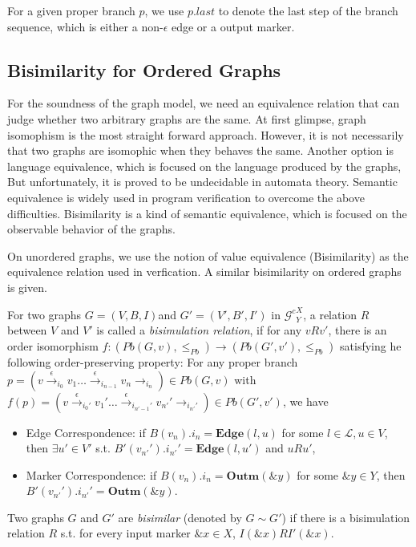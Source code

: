 \documentclass{llncs}
\newcommand{\act}[1]{{\xrightarrow{#1}{}}}
\newcommand{\Gc}{{\mathcal{G}^{c}}}
\begin{document}
For a given proper branch $p$, we use $p.last$ to denote the last step of the branch sequence, which is either a non-$\epsilon$ edge or a output marker.

\subsection{Bisimilarity for Ordered Graphs}

For the soundness of the graph model, we need an equivalence relation that can judge whether two arbitrary graphs are the same. At first glimpse, graph isomophism is the most straight forward approach. However, it is not necessarily that two graphs are isomophic when they behaves the same. Another option is language equivalence, which is focused on the language produced by the graphs, But unfortunately, it is proved to be undecidable in automata theory. Semantic equivalence is widely used in program verification to overcome the above difficulties. Bisimilarity is a kind of semantic equivalence, which is focused on the observable behavior of the graphs. 

On unordered graphs, we use the notion of value equivalence (Bisimilarity) as the equivalence relation used in verfication. A similar bisimilarity on ordered graphs is given.

For two graphs $G=(V,B,I)$and $G'=(V',B',I')$ in $\Gc^X_Y$, a relation $R$ between $V$ and $V'$ is called a \emph{bisimulation relation}, if for any $vRv'$, there is an order isomorphism $f:(Pb(G,v),\leq_{Pb})\rightarrow(Pb(G',v'),\leq_{Pb})$ satisfying he following order-preserving property: For any proper branch $p=(v\act{\epsilon}_{i_0}v_1\ldots\act{\epsilon}_{i_{n-1}}v_n\act{}_{i_n})\in Pb(G,v)$ with $f(p)=(v\act{\epsilon}_{i_0'}v_1'\ldots\act{\epsilon}_{i_{n'-1}'}v_{n'}'\act{}_{i_{n'}'})\in Pb(G',v')$, we have
\begin{itemize}
    \item Edge Correspondence: if $B(v_n).i_n=\mathbf{Edge}(l,u)$ for some $l\in\mathcal{L}, u\in V$, then  $\exists u'\in V'$ s.t. $B'(v_{n'}').i_{n'}'=\mathbf{Edge}(l,u')$ and $uRu'$,
    \item Marker Correspondence: if $B(v_n).i_n=\mathbf{Outm}(\&y)$ for some $\&y\in Y$, then $B'(v_{n'}').i_{n'}'=\mathbf{Outm}(\&y)$.
\end{itemize}
Two graphs $G$ and $G'$ are \emph{bisimilar} (denoted by $G\sim G'$) if there is a bisimulation relation $R$ s.t. for every input marker $\&x\in X$, $I(\&x)RI'(\&x)$.
\end{document}

